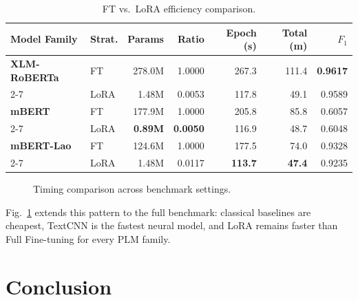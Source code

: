 \documentclass[conference, onecolumn]{IEEEtran}
\begin{document}
\begin{table}[!htbp]
\centering
\caption{FT vs.\ LoRA efficiency comparison.}
\footnotesize
\renewcommand{\arraystretch}{1.0}
\setlength{\tabcolsep}{3pt}
\begin{tabular}{|p{}|p{}|r|r|r|r|r|}
\hline
\textbf{Model Family} & \textbf{Strat.} & \textbf{Params} & \textbf{Ratio} & \textbf{Epoch (s)} & \textbf{Total (m)} & \textbf{$F_1$} \\
\hline
{\textbf{XLM-RoBERTa}}
& FT   & 278.0M          & 1.0000          & 267.3          & 111.4          & \textbf{0.9617} \\
\cline{2-7}
& LoRA & 1.48M           & 0.0053          & 117.8          & 49.1           & 0.9589 \\
\hline
{\textbf{mBERT}}
& FT   & 177.9M          & 1.0000          & 205.8          & 85.8           & 0.6057 \\
\cline{2-7}
& LoRA & \textbf{0.89M}  & \textbf{0.0050} & 116.9          & 48.7           & 0.6048 \\
\hline
{\textbf{mBERT-Lao}}
& FT   & 124.6M          & 1.0000          & 177.5          & 74.0           & 0.9328 \\
\cline{2-7}
& LoRA & 1.48M           & 0.0117          & \textbf{113.7} & \textbf{47.4}  & 0.9235 \\
\hline
\end{tabular}
\label{tab:efficiency}
\end{table}

\begin{figure}[H]
\centering

\caption{Timing comparison across benchmark settings.}
\label{fig:timing}
\end{figure}

Fig.~\ref{fig:timing} extends this pattern to the full benchmark: classical baselines are cheapest, TextCNN is the fastest neural model, and LoRA remains faster than Full Fine-tuning for every PLM family.


\section{Conclusion}
\label{sec:conclusion}
\end{document}
